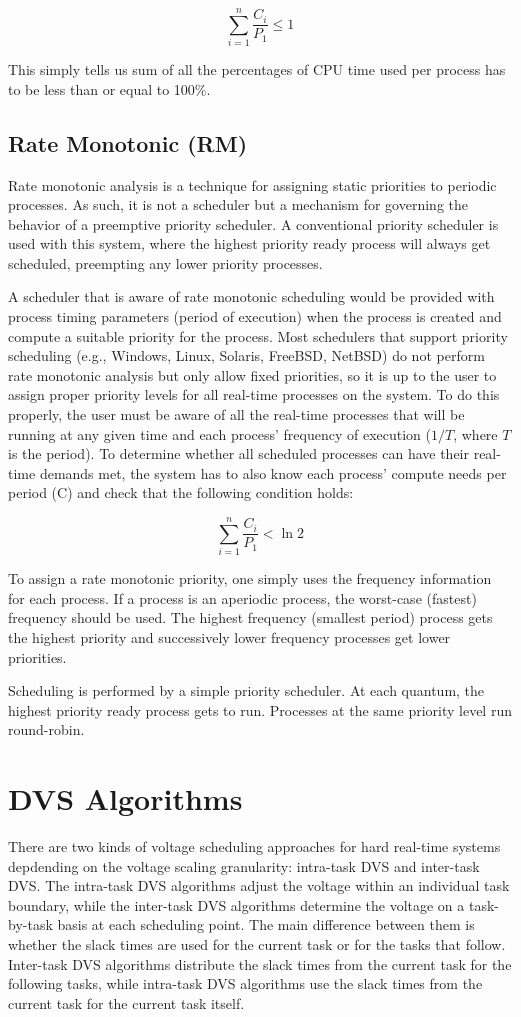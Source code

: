 \documentclass[10pt,article]{IEEEtran}
\begin{document}
$$\sum_{i = 1}^{n} \frac{C_i}{P_1} \leq 1$$

This simply tells us sum of all the percentages of CPU time used per process has to be less than or equal to 100\%. 

\subsection{Rate Monotonic (RM)}
 Rate monotonic analysis is a technique for assigning static priorities to periodic processes. As such, it is not a scheduler but a mechanism for governing the behavior of a preemptive priority scheduler. A conventional priority scheduler is used with this system, where the highest priority ready process will always get scheduled, preempting any lower priority processes.

A scheduler that is aware of rate monotonic scheduling would be provided with process timing parameters (period of execution) when the process is created and compute a suitable priority for the process. Most schedulers that support priority scheduling (e.g., Windows, Linux, Solaris, FreeBSD, NetBSD) do not perform rate monotonic analysis but only allow fixed priorities, so it is up to the user to assign proper priority levels for all real-time processes on the system. To do this properly, the user must be aware of all the real-time processes that will be running at any given time and each process' frequency of execution ($1/T$, where $T$ is the period). To determine whether all scheduled processes can have their real-time demands met, the system has to also know each process' compute needs per period (C) and check that the following condition holds: 

$$\sum_{i = 1}^{n} \frac{C_i}{P_1} < \ln 2$$

To assign a rate monotonic priority, one simply uses the frequency information for each process. If a process is an aperiodic process, the worst-case (fastest) frequency should be used. The highest frequency (smallest period) process gets the highest priority and successively lower frequency processes get lower priorities.

Scheduling is performed by a simple priority scheduler. At each quantum, the highest priority ready process gets to run. Processes at the same priority level run round-robin.

\section{DVS Algorithms} \label{sec:dvs-algs}
There are two kinds of voltage scheduling approaches for hard real-time systems depdending on the voltage scaling granularity: intra-task DVS and inter-task DVS. The intra-task DVS algorithms adjust the voltage within an individual task boundary, while the inter-task DVS algorithms determine the voltage on a task-by-task basis at each scheduling point. The main difference between them is whether the slack times are used for the current task or for the tasks that follow. Inter-task DVS algorithms distribute the slack times from the current task for the following tasks, while intra-task DVS algorithms use the slack times from the current task for the current task itself.
\end{document}

